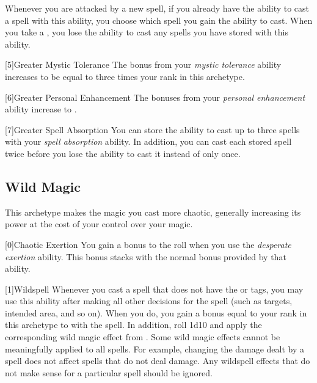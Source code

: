         Whenever you are attacked by a new spell, if you already have the ability to cast a spell with this ability, you choose which spell you gain the ability to cast.
        When you take a , you lose the ability to cast any spells you have stored with this ability.

        [5]{Greater Mystic Tolerance} The bonus from your \textit{mystic tolerance} ability increases to be equal to three times your rank in this archetype.

        [6]{Greater Personal Enhancement} The bonuses from your \textit{personal enhancement} ability increase to .

        [7]{Greater Spell Absorption} You can store the ability to cast up to three spells with your \textit{spell absorption} ability.
        In addition, you can cast each stored spell twice before you lose the ability to cast it instead of only once.

    \newpage
    \subsection{Wild Magic}
        This archetype makes the magic you cast more chaotic, generally increasing its power at the cost of your control over your magic.

        [0]{Chaotic Exertion} You gain a  bonus to the roll when you use the \textit{desperate exertion} ability.
        This bonus stacks with the normal  bonus provided by that ability.

        [1]{Wildspell} Whenever you cast a spell that does not have the  or  tags, you may use this ability after making all other decisions for the spell (such as targets, intended area, and so on).
        When you do, you gain a bonus equal to your rank in this archetype to  with the spell.
        In addition, roll 1d10 and apply the corresponding wild magic effect from .
        Some wild magic effects cannot be meaningfully applied to all spells.
        For example, changing the damage dealt by a spell does not affect spells that do not deal damage.
        Any wildspell effects that do not make sense for a particular spell should be ignored.

